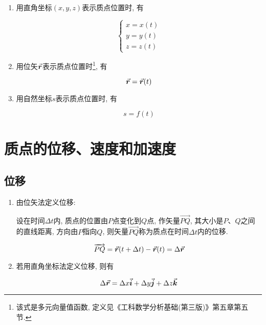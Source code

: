 \begin{enumerate}
	
	\item 用直角坐标$(x,y,z)$表示质点位置时, 有
	
	\begin{equation}
		\begin{cases}
			x = x(t) \\
			y = y(t) \\
			z = z(t) 
		\end{cases}
	    \label{C1-eq2}
	\end{equation}
	
	\item 用位矢$\va*{r}$表示质点位置时\footnote{该式是多元向量值函数, 定义见《工科数学分析基础(第三版)》第五章第五节. }, 有
	
	\begin{equation}
		\va*{r} = \va*{r}(t) \label{C1-eq3}
	\end{equation}
	
	\item 用自然坐标$s$表示质点位置时, 有
	
	\begin{equation}
		s = f(t) \label{C1-eq4}
	\end{equation}
	
\end{enumerate}

\section{质点的位移、速度和加速度} \label{1.2}

\subsection{位移}

\begin{enumerate}
	
	\item 由位矢法定义位移: 
	
	\begin{definition}[位移] \label{C1-df2}
		
		设在时间$\Delta t$内, 质点的位置由$P$点变化到$Q$点, 作矢量$\overrightarrow{PQ}$, 其大小是$P$、$Q$之间的直线距离, 方向由$P$指向$Q$, 则矢量$\overrightarrow{PQ}$称为质点在时间$\Delta t$内的{\heiti 位移}. 
		
		\begin{equation}
			\overrightarrow{PQ} = \va*{r}(t + \Delta t) - \va*{r}(t) = \Delta \va*{r}
			\label{C1-eq5}
		\end{equation}
		
	\end{definition}
	
	\item 若用直角坐标法定义位移, 则有
	
	\begin{equation}
		\Delta \va*{r} = \Delta x \va*{i} + \Delta y \va*{j} + \Delta z \va*{k} \label{C1-eq6}
	\end{equation}
	
\end{enumerate}

